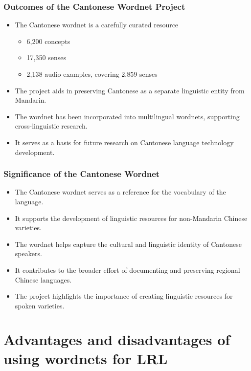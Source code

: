 \documentclass[xetex]{beamer}  %
\begin{document}
\begin{frame}
\frametitle{Outcomes of the Cantonese Wordnet Project}

\begin{itemize}
\item The Cantonese wordnet is a carefully curated resource 
  \begin{itemize}
  \item 6,200 concepts
  \item 17,350 senses
  \item 2,138 audio examples, covering 2,859 senses
  \end{itemize}
    \item The project aids in preserving Cantonese as a separate linguistic entity from Mandarin.
    \item The wordnet has been incorporated into multilingual wordnets, supporting cross-linguistic research.
    \item It serves as a basis for future research on Cantonese language technology development.
\end{itemize}
\end{frame}

\begin{frame}
\frametitle{Significance of the Cantonese Wordnet}

\begin{itemize}
    \item The Cantonese wordnet serves as a reference for the vocabulary of the language.
    \item It supports the development of linguistic resources for non-Mandarin Chinese varieties.
    \item The wordnet helps capture the cultural and linguistic identity of Cantonese speakers.
    \item It contributes to the broader effort of documenting and preserving regional Chinese languages.
    \item The project highlights the importance of creating linguistic resources for spoken varieties.
\end{itemize}
\end{frame}

\section{Advantages and disadvantages of using wordnets for LRL}
\end{document}
